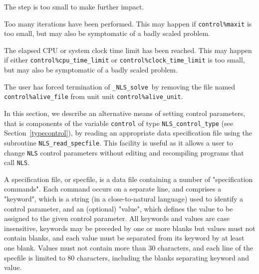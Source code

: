 \documentclass{galahad}
\newcommand{\packagename}{NLS}
\newcommand{\fullpackagename}{\libraryname\_\packagename}
\newcommand{\solver}{{\tt \fullpackagename\_solve}}
\begin{document}
\begin{description}
 The step is too small to make further impact.

 Too many iterations have been performed.
  This may happen if
    {\tt control\%maxit} is too small, but may also be symptomatic of
    a badly scaled problem.

 The elapsed CPU or system clock time limit has been
    reached. This may happen if either {\tt control\%cpu\_time\_limit} or
    {\tt control\%clock\_time\_limit} is too small, but may also be symptomatic
    of a badly scaled problem.

 The user has forced termination of \solver\
     by removing the file named {\tt control\%a\-live\_file} from unit
     unit {\tt control\%alive\_unit}.

\end{description}


\galfeatures
\noindent In this section, we describe an alternative means of setting
control parameters, that is components of the variable {\tt control} of type
{\tt \packagename\_control\_type}
(see Section~\ref{typecontrol}),
by reading an appropriate data specification file using the
subroutine {\tt \packagename\_read\_specfile}. This facility
is useful as it allows a user to change  {\tt \packagename} control parameters
without editing and recompiling programs that call {\tt \packagename}.

A specification file, or specfile, is a data file containing a number of
"specification commands". Each command occurs on a separate line,
and comprises a "keyword",
which is a string (in a close-to-natural language) used to identify a
control parameter, and
an (optional) "value", which defines the value to be assigned to the given
control parameter. All keywords and values are case insensitive,
keywords may be preceded by one or more blanks but
values must not contain blanks, and
each value must be separated from its keyword by at least one blank.
Values must not contain more than 30 characters, and
each line of the specfile is limited to 80 characters,
including the blanks separating keyword and value.
\end{document}
